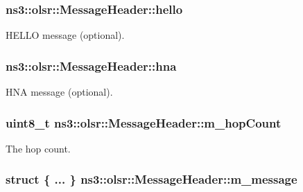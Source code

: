 \subsubsection[{\texorpdfstring{hello}{hello}}]{ ns3\+::olsr\+::\+Message\+Header\+::hello}\hypertarget{classns3_1_1olsr_1_1MessageHeader_a6040af69f6f6c66412e715d149d46d53}{}\label{classns3_1_1olsr_1_1MessageHeader_a6040af69f6f6c66412e715d149d46d53}


H\+E\+L\+LO message (optional). 

\subsubsection[{\texorpdfstring{hna}{hna}}]{ ns3\+::olsr\+::\+Message\+Header\+::hna}\hypertarget{classns3_1_1olsr_1_1MessageHeader_a7515b4b2db90cc1ce1affe1b666d3195}{}\label{classns3_1_1olsr_1_1MessageHeader_a7515b4b2db90cc1ce1affe1b666d3195}


H\+NA message (optional). 

\subsubsection[{\texorpdfstring{m\+\_\+hop\+Count}{m_hopCount}}]{\setlength{\rightskip}{0pt plus 5cm}uint8\+\_\+t ns3\+::olsr\+::\+Message\+Header\+::m\+\_\+hop\+Count\hspace{0.3cm}{\ttfamily [private]}}\hypertarget{classns3_1_1olsr_1_1MessageHeader_a5e0ea339a36bbe7bfb7026cf01740ad4}{}\label{classns3_1_1olsr_1_1MessageHeader_a5e0ea339a36bbe7bfb7026cf01740ad4}


The hop count. 

\subsubsection[{\texorpdfstring{m\+\_\+message}{m_message}}]{\setlength{\rightskip}{0pt plus 5cm}struct \{ ... \}   ns3\+::olsr\+::\+Message\+Header\+::m\+\_\+message\hspace{0.3cm}{\ttfamily [private]}}\hypertarget{classns3_1_1olsr_1_1MessageHeader_a5150b6b6822c808597f55f13025646f5}{}\label{classns3_1_1olsr_1_1MessageHeader_a5150b6b6822c808597f55f13025646f5}



